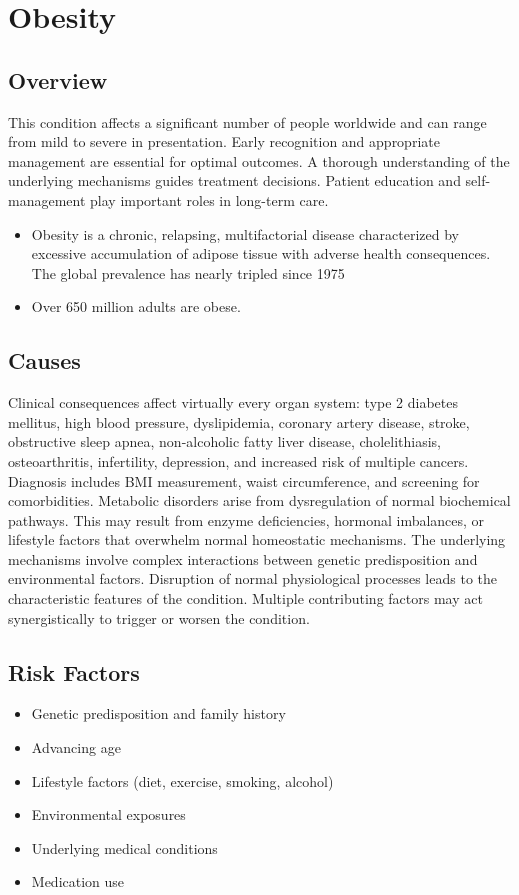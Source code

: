 \chapter{Obesity}
\label{sec:Obesity}

\section{Overview}
This condition affects a significant number of people worldwide and can range from mild to severe in presentation. Early recognition and appropriate management are essential for optimal outcomes. A thorough understanding of the underlying mechanisms guides treatment decisions. Patient education and self-management play important roles in long-term care.

\begin{itemize}[noitemsep]
  \item Obesity is a chronic, relapsing, multifactorial disease characterized by excessive accumulation of adipose tissue with adverse health consequences. The global prevalence has nearly tripled since 1975
  \item Over 650 million adults are obese.
\end{itemize}
\section{Causes}
Clinical consequences affect virtually every organ system: type 2 diabetes mellitus, high blood pressure, dyslipidemia, coronary artery disease, stroke, obstructive sleep apnea, non-alcoholic fatty liver disease, cholelithiasis, osteoarthritis, infertility, depression, and increased risk of multiple cancers. Diagnosis includes BMI measurement, waist circumference, and screening for comorbidities. Metabolic disorders arise from dysregulation of normal biochemical pathways. This may result from enzyme deficiencies, hormonal imbalances, or lifestyle factors that overwhelm normal homeostatic mechanisms. The underlying mechanisms involve complex interactions between genetic predisposition and environmental factors. Disruption of normal physiological processes leads to the characteristic features of the condition. Multiple contributing factors may act synergistically to trigger or worsen the condition.
\section{Risk Factors}
\begin{itemize}[noitemsep]
  \item Genetic predisposition and family history
  \item Advancing age
  \item Lifestyle factors (diet, exercise, smoking, alcohol)
  \item Environmental exposures
  \item Underlying medical conditions
  \item Medication use
\end{itemize}
